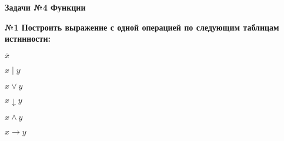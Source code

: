 \usepackage{stmaryrd}%




    \begin{center}
        \textbf{Задачи №4 Функции}\\
    \end{center}

    \begin{center}
        \textbf{№1 Построить выражение с одной операцией по следующим таблицам истинности:}
    \end{center}

    \begin{minipage}[t]{0.25\textwidth}
        \begin{enumerate}
            \setcounter{enumi}{0}
            \begin{spacing}{0.5}
                \item $\overline x$\\
            \end{spacing}
            \setcounter{enumi}{4}
            \begin{spacing}{0.5}
                \item $x \mid y$\\
            \end{spacing}
        \end{enumerate}
    \end{minipage}
    \begin{minipage}[t]{0.25\textwidth}
        \begin{enumerate}
            \setcounter{enumi}{1}
            \begin{spacing}{0.5}
                \item $x \vee y$\\
            \end{spacing}
            \setcounter{enumi}{5}
            \begin{spacing}{0.5}
                \item $x \downarrow y$\\
            \end{spacing}
        \end{enumerate}
    \end{minipage}
    \begin{minipage}[t]{0.25\textwidth}
        \begin{enumerate}
            \setcounter{enumi}{2}
            \begin{spacing}{0.5}
                \item $x \wedge y$\\
            \end{spacing}
            \setcounter{enumi}{6}
            \begin{spacing}{0.5}
                \item $x \rightarrow y$\\
            \end{spacing}
        \end{enumerate}
    \end{minipage}
